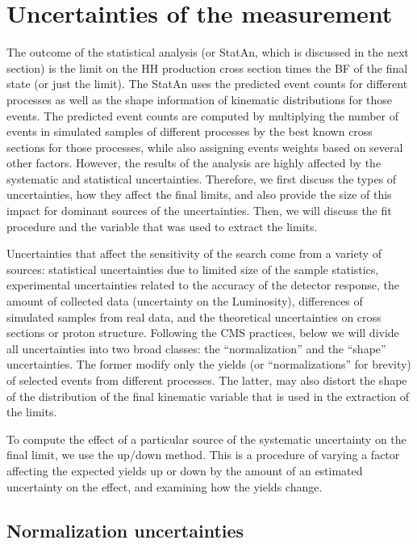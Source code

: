 \section{Uncertainties of the measurement}
\label{sec:Systematics}

The outcome of the statistical analysis (or StatAn, which is discussed in the next section) is the limit on the HH production cross section times the BF of the final state (or just the limit). The StatAn uses the predicted event counts for different processes as well as the shape information of kinematic distributions for those events. The predicted event  counts are computed by multiplying the number of events in simulated samples of different processes by the best known cross sections for those processes, while also assigning events weights based on several other factors. However, the results of the analysis are highly affected by the systematic and statistical uncertainties. Therefore, we first discuss the types of uncertainties, how they affect the final limits, and also provide the size of this impact for dominant sources of the uncertainties. Then, we will discuss the fit procedure and the variable that was used to extract the limits. 

Uncertainties that affect the sensitivity of the search come from a variety of sources: statistical uncertainties due to limited size of the sample statistics, experimental uncertainties related to the accuracy of the detector response, the amount of collected data (uncertainty on the Luminosity), differences of simulated samples from real data, and the theoretical uncertainties on cross sections or proton structure. Following the CMS practices, below we will divide all uncertainties into two broad classes: the ``normalization'' and the ``shape''  uncertainties. The former modify only the yields (or ``normalizations'' for brevity) of selected events from different processes. The latter, may also distort the shape of the distribution of the final kinematic variable that is used in the extraction of the limits.

To compute the effect of a particular source of the systematic uncertainty on the final limit, we use the up/down method. This is a procedure of varying a factor affecting the expected yields up or down by the amount of an estimated uncertainty on the effect, and examining how the yields change.
 
\subsection{Normalization uncertainties}

